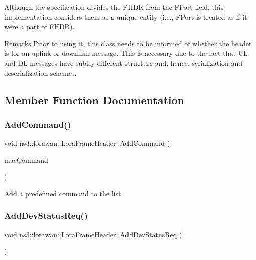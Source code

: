 Although the specification divides the F\+H\+DR from the F\+Port field, this implementation considers them as a unique entity (i.\+e., F\+Port is treated as if it were a part of F\+H\+DR).

\begin{DoxyRemark}{Remarks}
Prior to using it, this class needs to be informed of whether the header is for an uplink or downlink message. This is necessary due to the fact that UL and DL messages have subtly different structure and, hence, serialization and deserialization schemes. 
\end{DoxyRemark}


\subsection{Member Function Documentation}
\mbox{\label{classns3_1_1lorawan_1_1LoraFrameHeader_a238abef9aa4e39c628e395485abb89b8}} 
\subsubsection{\texorpdfstring{Add\+Command()}{AddCommand()}}
{\footnotesize\ttfamily void ns3\+::lorawan\+::\+Lora\+Frame\+Header\+::\+Add\+Command (\begin{DoxyParamCaption}\item[{Ptr$<$ \hyperlink{classns3_1_1lorawan_1_1MacCommand}{Mac\+Command} $>$}]{mac\+Command }\end{DoxyParamCaption})}

Add a predefined command to the list. \mbox{\label{classns3_1_1lorawan_1_1LoraFrameHeader_a567bccb9daf4936cb13c70f245e563bd}} 
\subsubsection{\texorpdfstring{Add\+Dev\+Status\+Req()}{AddDevStatusReq()}}
{\footnotesize\ttfamily void ns3\+::lorawan\+::\+Lora\+Frame\+Header\+::\+Add\+Dev\+Status\+Req (\begin{DoxyParamCaption}\item[{void}]{ }\end{DoxyParamCaption})}

